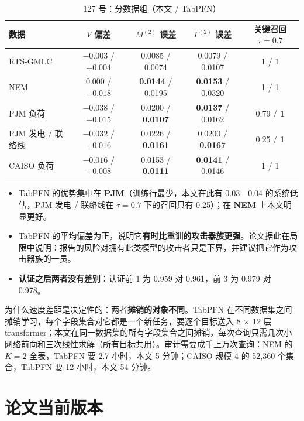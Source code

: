 \documentclass[zihao=-4,a4paper]{ctexart}
\begin{document}
\begin{table}[H]\centering
\caption{127 号：分数据组（本文 / TabPFN）}
\small
\begin{tabular}{lcccc}
\toprule
数据 & $V$ 偏差 & $M^{(2)}$ 误差 & $\Gamma^{(2)}$ 误差 & 关键召回 $\tau=0.7$ \\
\midrule
RTS-GMLC & $-0.003$ / $+0.004$ & 0.0085 / 0.0074 & 0.0079 / 0.0107 & 1 / 1 \\
NEM & 0.000 / $-0.018$ & \textbf{0.0144} / 0.0195 & \textbf{0.0153} / 0.0320 & 1 / 1 \\
PJM 负荷 & $-0.038$ / $+0.015$ & 0.0200 / \textbf{0.0107} & \textbf{0.0137} / 0.0162 & 0.79 / \textbf{1} \\
PJM 发电 / 联络线 & $-0.032$ / $+0.016$ & 0.0226 / \textbf{0.0161} & 0.0200 / \textbf{0.0167} & 0.25 / \textbf{1} \\
CAISO 负荷 & $-0.016$ / $+0.008$ & 0.0153 / \textbf{0.0111} & \textbf{0.0141} / 0.0146 & 1 / 1 \\
\bottomrule
\end{tabular}
\end{table}

\begin{itemize}[leftmargin=*]
  \item TabPFN 的优势集中在 \textbf{PJM}（训练行最少，本文在此有 0.03—0.04 的系统低估，PJM 发电 / 联络线在 $\tau=0.7$ 下的召回只有 0.25）；在 \textbf{NEM} 上本文明显更好。
  \item TabPFN 的平均偏差为正，说明它\textbf{有时比重训的攻击器族更强}。论文据此在局限中说明：报告的风险对拥有此类模型的攻击者只是下界，并建议把它作为攻击器族的一员。
  \item \textbf{认证之后两者没有差别}：认证前 1 为 0.959 对 0.961，前 3 为 0.979 对 0.978。
\end{itemize}

\begin{notebox}
为什么速度差距是决定性的：两者\textbf{摊销的对象不同}。TabPFN 在不同数据集之间摊销学习，每个字段集合对它都是一个新任务，要逐个目标送入 8 $\times$ 12 层 transformer；本文在同一数据集的所有字段集合之间摊销，每次查询只需几次小网络前向和三次线性求解（所有目标共用）。审计需要成千上万次查询：NEM 的 $K=2$ 全表，TabPFN 要 2.7 小时，本文 5 分钟；CAISO 规模 4 的 52,360 个集合，TabPFN 要 12 小时，本文 54 分钟。
\end{notebox}

\section{论文当前版本}
\end{document}
